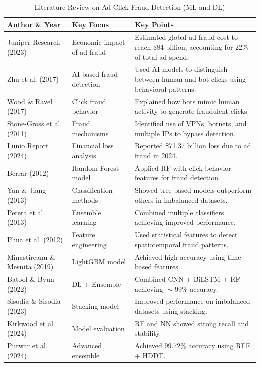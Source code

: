 \documentclass[conference]{IEEEtran}
\begin{document}
\begin{table}[t]
\caption{Literature Review on Ad-Click Fraud Detection (ML and DL)}
\centering
\begin{tabularx}{\textwidth}{@{}l l X@{}}
\toprule
\textbf{Author \& Year} & \textbf{Key Focus} & \textbf{Key Points} \\
\midrule
Juniper Research (2023) \cite{b1} & Economic impact of ad fraud & Estimated global ad fraud cost to reach \$84 billion, accounting for 22\% of total ad spend. \\
Zhu et al. (2017) \cite{b2} & AI-based fraud detection & Used AI models to distinguish between human and bot clicks using behavioral patterns. \\
Wood \& Ravel (2017) \cite{b3} & Click fraud behavior & Explained how bots mimic human activity to generate fraudulent clicks. \\
Stone-Gross et al. (2011) \cite{b4} & Fraud mechanisms & Identified use of VPNs, botnets, and multiple IPs to bypass detection. \\
Lunio Report (2024) \cite{b5} & Financial loss analysis & Reported \$71.37 billion loss due to ad fraud in 2024. \\
Berrar (2012) \cite{b6} & Random Forest model & Applied RF with click behavior features for fraud detection. \\
Yan \& Jiang (2013) \cite{b7} & Classification methods & Showed tree-based models outperform others in imbalanced datasets. \\
Perera et al. (2013) \cite{b8} & Ensemble learning & Combined multiple classifiers achieving improved performance. \\
Phua et al. (2012) \cite{b9} & Feature engineering & Used statistical features to detect spatiotemporal fraud patterns. \\
Minastireanu \& Mesnita (2019) \cite{b10} & LightGBM model & Achieved high accuracy using time-based features. \\
Batool \& Byun (2022) \cite{b11} & DL + Ensemble & Combined CNN + BiLSTM + RF achieving $\sim$99\% accuracy. \\
Sisodia \& Sisodia (2023) \cite{b12} & Stacking model & Improved performance on imbalanced datasets using stacking. \\
Kirkwood et al. (2024) \cite{b13} & Model evaluation & RF and NN showed strong recall and stability. \\
Purwar et al. (2024) \cite{b14} & Advanced ensemble & Achieved 99.72\% accuracy using RFE + HDDT. \\
\bottomrule
\end{tabularx}
\end{table}
\end{document}
